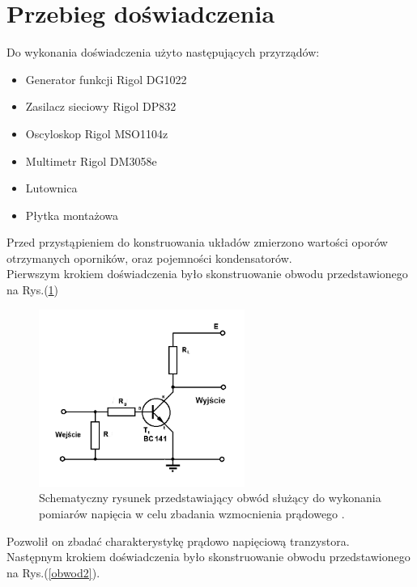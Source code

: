 \documentclass[10pt,a4paper]{article}
\begin{document}
\section*{Przebieg doświadczenia}
Do wykonania doświadczenia użyto następujących przyrządów:
\begin{itemize}
\item{Generator funkcji Rigol DG1022}
\item{Zasilacz sieciowy Rigol DP832}
\item{Oscyloskop Rigol MSO1104z}
\item{Multimetr Rigol DM3058e}
\item{Lutownica}
\item{Płytka montażowa}
\end{itemize}
Przed przystąpieniem do konstruowania układów zmierzono wartości oporów otrzymanych oporników, oraz pojemności kondensatorów. \\
Pierwszym krokiem doświadczenia było skonstruowanie obwodu przedstawionego na Rys.(\ref{obwod1})
\begin{figure}[ht!]	
	\begin{center}
		\includegraphics[width = 0.6\textwidth]{obwod1.png}
		\caption{Schematyczny rysunek przedstawiający obwód służący do wykonania pomiarów napięcia w celu zbadania wzmocnienia prądowego \cite{schematy}.}
		\label{obwod1}
	\end{center}
\end{figure}	
Pozwolił on zbadać charakterystykę prądowo napięciową tranzystora. \\
Następnym krokiem doświadczenia było skonstruowanie obwodu przedstawionego na Rys.(\ref{obwod2}).
\end{document}
